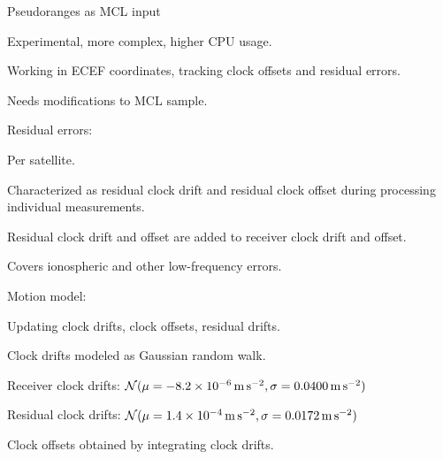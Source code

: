 \begin{compactitem}
\item
Pseudoranges as MCL input
\begin{compactitem}
    \item
    Experimental, more complex, higher CPU usage.

    \item
    Working in ECEF coordinates, tracking clock offsets and residual errors.

    \item
    Needs modifications to MCL sample.

    \item
    Residual errors:
    \begin{compactitem}
        \item Per satellite.
        \item Characterized as residual clock drift and residual clock offset
              during processing individual measurements.
        \item Residual clock drift and offset are added to receiver clock drift and offset.
        \item Covers ionospheric and other low-frequency errors.
    \end{compactitem}

    \item
    Motion model:
    \begin{compactitem}
        \item Updating clock drifts, clock offsets, residual drifts.
        \item Clock drifts modeled as Gaussian random walk.
        \begin{compactitem}
            \item Receiver clock drifts:
                  \(\operatorname{\mathcal{N}}(\mu = \SI{-8.2e-06}{\meter\per\second\squared}, \sigma = \SI{0.0400}{\meter\per\second\squared})\)
            \item Residual clock drifts:
                  \(\operatorname{\mathcal{N}}(\mu = \SI{1.4e-4}{\meter\per\second\squared}, \sigma = \SI{0.0172}{\meter\per\second\squared})\)
        \end{compactitem}
        \item Clock offsets obtained by integrating clock drifts.
        \item {}
    \end{compactitem}


\end{compactitem}
\end{compactitem}
